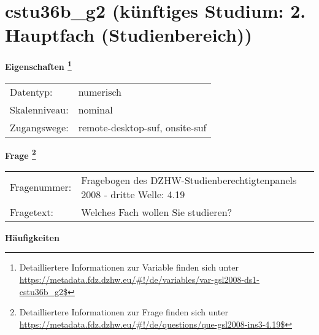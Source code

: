 
    \setcounter{footnote}{0}

    \vspace*{-1.8cm}
	\section{cstu36b\_g2 (künftiges Studium: 2. Hauptfach (Studienbereich))}
	\label{section:cstu36b_g2}



    \vspace*{0.5cm}
    \noindent\textbf{Eigenschaften
	\footnote{Detailliertere Informationen zur Variable finden sich unter
		\url{https://metadata.fdz.dzhw.eu/\#!/de/variables/var-gsl2008-ds1-cstu36b_g2$}}}\\
	\begin{tabularx}{\hsize}{@{}lX}
	Datentyp: & numerisch \\
	Skalenniveau: & nominal \\
	Zugangswege: &
	  remote-desktop-suf, 
	  onsite-suf
 \\
    \end{tabularx}



				\vspace*{0.5cm}
                \noindent\textbf{Frage
	                \footnote{Detailliertere Informationen zur Frage finden sich unter
		              \url{https://metadata.fdz.dzhw.eu/\#!/de/questions/que-gsl2008-ins3-4.19$}}}\\
				\begin{tabularx}{\hsize}{@{}lX}
					Fragenummer: &
					  Fragebogen des DZHW-Studienberechtigtenpanels 2008 - dritte Welle:
					  4.19
 \\
					Fragetext: & Welches Fach wollen Sie studieren? \\
				\end{tabularx}





        		\vspace*{0.5cm}
                \noindent\textbf{Häufigkeiten}

